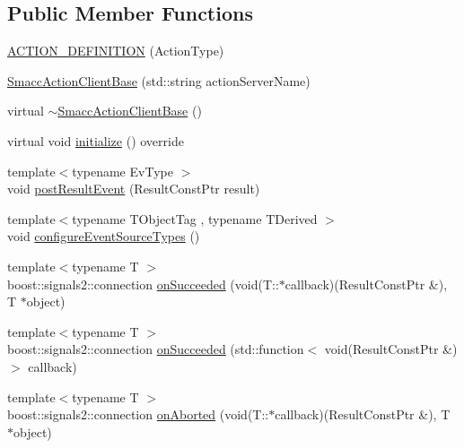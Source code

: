 \subsection*{Public Member Functions}
\begin{DoxyCompactItemize}
\item 
\hyperlink{classsmacc_1_1client__bases_1_1SmaccActionClientBase_a2936b800b46ac557550cbeda563209b3}{A\+C\+T\+I\+O\+N\+\_\+\+D\+E\+F\+I\+N\+I\+T\+I\+ON} (Action\+Type)
\item 
\hyperlink{classsmacc_1_1client__bases_1_1SmaccActionClientBase_af38f27dd26f8a87fea6b3eaa4a84e604}{Smacc\+Action\+Client\+Base} (std\+::string action\+Server\+Name)
\item 
virtual \hyperlink{classsmacc_1_1client__bases_1_1SmaccActionClientBase_aa6daf2d88aa6254e5a5c10b2c2152fad}{$\sim$\+Smacc\+Action\+Client\+Base} ()
\item 
virtual void \hyperlink{classsmacc_1_1client__bases_1_1SmaccActionClientBase_a72967f255f85e35718a1e1b0b48c38ff}{initialize} () override
\item 
{\footnotesize template$<$typename Ev\+Type $>$ }\\void \hyperlink{classsmacc_1_1client__bases_1_1SmaccActionClientBase_ad84470e029cc996685f44ad0d4062c29}{post\+Result\+Event} (Result\+Const\+Ptr result)
\item 
{\footnotesize template$<$typename T\+Object\+Tag , typename T\+Derived $>$ }\\void \hyperlink{classsmacc_1_1client__bases_1_1SmaccActionClientBase_a8d8e9c0be98ab5bf0ed666fd2fa0892b}{configure\+Event\+Source\+Types} ()
\item 
{\footnotesize template$<$typename T $>$ }\\boost\+::signals2\+::connection \hyperlink{classsmacc_1_1client__bases_1_1SmaccActionClientBase_af6d77c27d21b2e4f621f53c5f1df088b}{on\+Succeeded} (void(T\+::$\ast$callback)(Result\+Const\+Ptr \&), T $\ast$object)
\item 
{\footnotesize template$<$typename T $>$ }\\boost\+::signals2\+::connection \hyperlink{classsmacc_1_1client__bases_1_1SmaccActionClientBase_a92053df4ebfd0e49bbbd4ba191bf3975}{on\+Succeeded} (std\+::function$<$ void(Result\+Const\+Ptr \&)$>$ callback)
\item 
{\footnotesize template$<$typename T $>$ }\\boost\+::signals2\+::connection \hyperlink{classsmacc_1_1client__bases_1_1SmaccActionClientBase_a75c58162621a705bfd11efdf068eb06b}{on\+Aborted} (void(T\+::$\ast$callback)(Result\+Const\+Ptr \&), T $\ast$object)

\end{DoxyCompactItemize}
